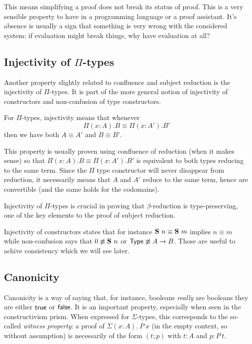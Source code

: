 This means simplifying a proof does not break its status of proof. This is a
very sensible property to have in a programming language or a proof assistant.
It's absence is usually a sign that something is very wrong with the considered
system: if evaluation might break things, why have evaluation at all?

\subsection{Injectivity of \(\Pi\)-types}

Another property slightly related to confluence and subject reduction is
the injectivity of \(\Pi\)-types. It is part of the more general notion of
injectivity of constructors and non-confusion of type constructors.

For \(\Pi\)-types, injectivity means that whenever
\[
  \Pi (x:A).B \equiv \Pi (x:A').B'
\]
then we have both \(A \equiv A'\) and \(B \equiv B'\).

This property is usually proven using confluence of reduction (when it makes
sense) so that \(\Pi (x:A).B \equiv \Pi (x:A').B'\) is equivalent to both types
reducing to the same term. Since the \(\Pi\) type constructor will never
disappear from reduction, it necessarily means that \(A\) and \(A'\) reduce to
the same term, hence are convertible (and the same holds for the codomains).

Injectivity of \(\Pi\)-types is crucial in proving that \(\beta\)-reduction is
type-preserving, one of the key elements to the proof of subject reduction.

Injectivity of constructors states that for instance
\(\mathbf{S}\ n \equiv \mathbf{S}\ m\) implies \(n \equiv m\) while non-confusion
says that \(0 \not\equiv \mathbf{S}\ n\) or \(\mathsf{Type} \not\equiv A \to B\).
Those are useful to achive consistency which we will see later.

\subsection{Canonicity}

Canonicity is a way of saying that, for instance, booleans \emph{really} are
booleans \ie they are either \(\mathsf{true}\) or \(\mathsf{false}\).
It is an important property, especially when seen in the constructivism prism.
When expressed for \(\Sigma\)-types, this corresponds to the so-called
\emph{witness property}: a proof of \(\Sigma (x:A).\ P\ x\) (in the empty
context, so without assumption) is necessarily of the form \((t;p)\)
with \(t : A\) and \(p : P\ t\).

